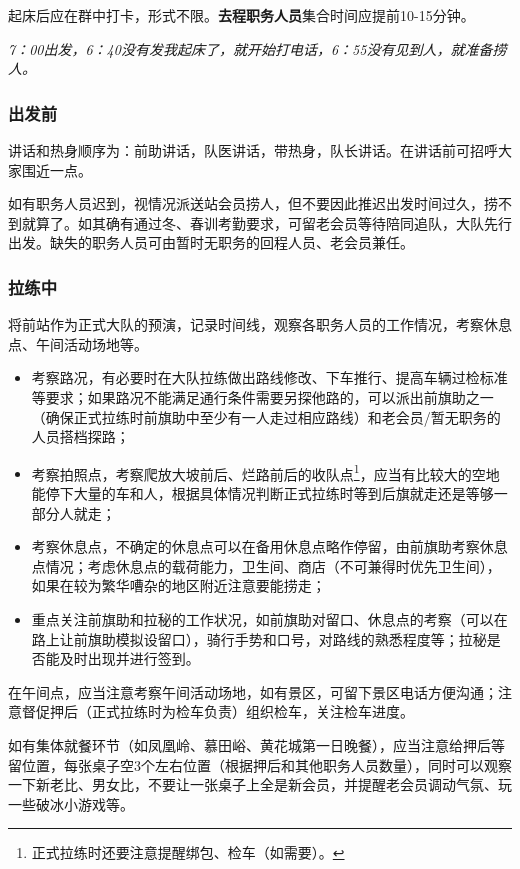 \documentclass[UTF8]{ctexart}
\begin{document}
起床后应在群中打卡，形式不限。\textbf{去程职务人员}集合时间应提前10-15分钟。

\textit{7：00出发，6：40没有发我起床了，就开始打电话，6：55没有见到人，就准备捞人。}

\subsubsection{出发前}

讲话和热身顺序为：前助讲话，队医讲话，带热身，队长讲话。在讲话前可招呼大家围近一点。

如有职务人员迟到，视情况派送站会员捞人，但不要因此推迟出发时间过久，捞不到就算了。如其确有通过冬、春训考勤要求，可留老会员等待陪同追队，大队先行出发。缺失的职务人员可由暂时无职务的回程人员、老会员兼任。

\subsubsection{拉练中}

将前站作为正式大队的预演，记录时间线，观察各职务人员的工作情况，考察休息点、午间活动场地等。

\begin{itemize}[nosep,left=4em]
    \item 考察路况，有必要时在大队拉练做出路线修改、下车推行、提高车辆过检标准等要求；如果路况不能满足通行条件需要另探他路的，可以派出前旗助之一（确保正式拉练时前旗助中至少有一人走过相应路线）和老会员/暂无职务的人员搭档探路；
    \item 考察拍照点，考察爬放大坡前后、烂路前后的收队点\footnote{正式拉练时还要注意提醒绑包、检车（如需要）。}，应当有比较大的空地能停下大量的车和人，根据具体情况判断正式拉练时等到后旗就走还是等够一部分人就走；
    \item 考察休息点，不确定的休息点可以在备用休息点略作停留，由前旗助考察休息点情况；考虑休息点的载荷能力，卫生间、商店（不可兼得时优先卫生间），如果在较为繁华嘈杂的地区附近注意要能捞走；
    \item 重点关注前旗助和拉秘的工作状况，如前旗助对留口、休息点的考察（可以在路上让前旗助模拟设留口），骑行手势和口号，对路线的熟悉程度等；拉秘是否能及时出现并进行签到。
\end{itemize}

在午间点，应当注意考察午间活动场地，如有景区，可留下景区电话方便沟通；注意督促押后（正式拉练时为检车负责）组织检车，关注检车进度。

如有集体就餐环节（如凤凰岭、慕田峪、黄花城第一日晚餐），应当注意给押后等留位置，每张桌子空3个左右位置（根据押后和其他职务人员数量），同时可以观察一下新老比、男女比，不要让一张桌子上全是新会员，并提醒老会员调动气氛、玩一些破冰小游戏等。
\end{document}
